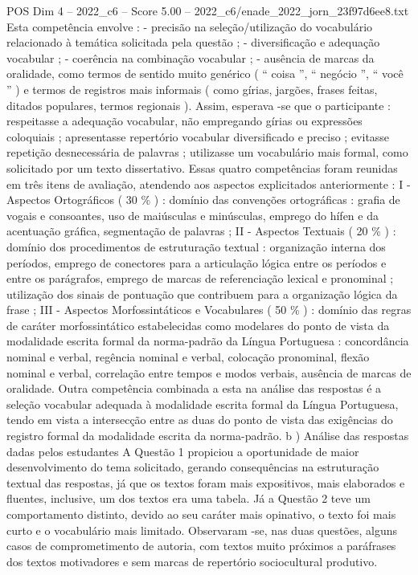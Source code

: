 \begin{textsample}{POS Dim 4 – 2022\_c6 – Score 5.00 – 2022\_c6/enade\_2022\_jorn\_23f97d6ee8.txt}
Esta competência envolve : - precisão na seleção/utilização do vocabulário relacionado à temática solicitada pela questão ; - diversificação e adequação vocabular ; - coerência na combinação vocabular ; - ausência de marcas da oralidade, como termos de sentido muito genérico ( “ coisa ”, “ negócio ”, “ você ” ) e termos de registros mais informais ( como gírias, jargões, frases feitas, ditados populares, termos regionais ).
Assim, esperava -se que o participante : respeitasse a adequação vocabular, não empregando gírias ou expressões coloquiais ; apresentasse repertório vocabular diversificado e preciso ; evitasse repetição desnecessária de palavras ; utilizasse um vocabulário mais formal, como solicitado por um texto dissertativo.
Essas quatro competências foram reunidas em três itens de avaliação, atendendo aos aspectos explicitados anteriormente : I - Aspectos Ortográficos ( 30 \% ) : domínio das convenções ortográficas : grafia de vogais e consoantes, uso de maiúsculas e minúsculas, emprego do hífen e da acentuação gráfica, segmentação de palavras ; II - Aspectos Textuais ( 20 \% ) : domínio dos procedimentos de estruturação textual : organização interna dos períodos, emprego de conectores para a articulação lógica entre os períodos e entre os parágrafos, emprego de marcas de referenciação lexical e pronominal ; utilização dos sinais de pontuação que contribuem para a organização lógica da frase ; III - Aspectos Morfossintáticos e Vocabulares ( 50 \% ) : domínio das regras de caráter morfossintático estabelecidas como modelares do ponto de vista da modalidade escrita formal da norma-padrão da Língua Portuguesa : concordância nominal e verbal, regência nominal e verbal, colocação pronominal, flexão nominal e verbal, correlação entre tempos e modos verbais, ausência de marcas de oralidade.
Outra competência combinada a esta na análise das respostas é a seleção vocabular adequada à modalidade escrita formal da Língua Portuguesa, tendo em vista a intersecção entre as duas do ponto de vista das exigências do registro formal da modalidade escrita da norma-padrão. b ) Análise das respostas dadas pelos estudantes A Questão 1 propiciou a oportunidade de maior desenvolvimento do tema solicitado, gerando consequências na estruturação textual das respostas, já que os textos foram mais expositivos, mais elaborados e fluentes, inclusive, um dos textos era uma tabela.
Já a Questão 2 teve um comportamento distinto, devido ao seu caráter mais opinativo, o texto foi mais curto e o vocabulário mais limitado.
Observaram -se, nas duas questões, alguns casos de comprometimento de autoria, com textos muito próximos a paráfrases dos textos motivadores e sem marcas de repertório sociocultural produtivo.

\end{textsample}
